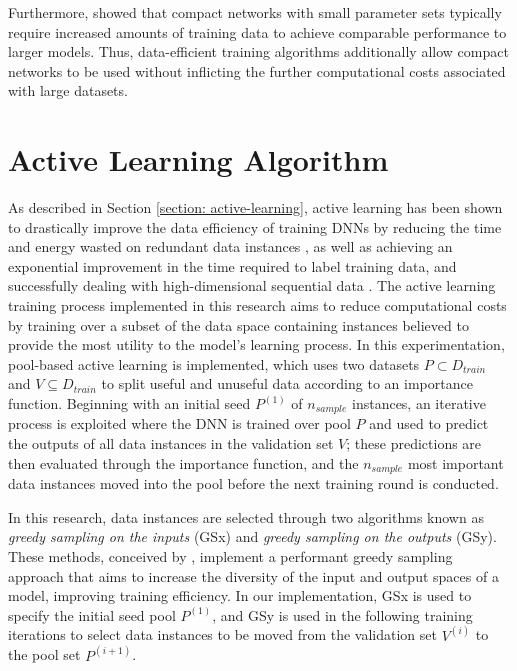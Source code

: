 \documentclass[a4paper, 11pt]{report}
\begin{document}
    Furthermore, \citet{bender-2021} showed that compact networks with small parameter sets typically require increased amounts of training data to achieve comparable performance to larger models. Thus, data-efficient training algorithms additionally allow compact networks to be used without inflicting the further computational costs associated with large datasets.


    \section{Active Learning Algorithm}
    \label{section: al-model}

    As described in Section \ref{section: active-learning}, active learning has been shown to drastically improve the data efficiency of training DNNs by reducing the time and energy wasted on redundant data instances \citep{xu-2021}, as well as achieving an exponential improvement in the time required to label training data, and successfully dealing with high-dimensional sequential data \citep{ren-2021}. The active learning training process implemented in this research aims to reduce computational costs by training over a subset of the data space containing instances believed to provide the most utility to the model's learning process. In this experimentation, pool-based active learning is implemented, which uses two datasets $P \subset D_{train}$ and $V \subseteq D_{train}$ to split useful and unuseful data according to an importance function. Beginning with an initial seed $P^{(1)}$ of $n_{sample}$ instances, an iterative process is exploited where the DNN is trained over pool $P$ and used to predict the outputs of all data instances in the validation set $V$; these predictions are then evaluated through the importance function, and the $n_{sample}$ most important data instances moved into the pool before the next training round is conducted.

    In this research, data instances are selected through two algorithms known as \emph{greedy sampling on the inputs} (GSx) and \emph{greedy sampling on the outputs} (GSy). These methods, conceived by \citet{wu-2019}, implement a performant greedy sampling approach that aims to increase the diversity of the input and output spaces of a model, improving training efficiency. In our implementation, GSx is used to specify the initial seed pool $P^{(1)}$, and GSy is used in the following training iterations to select data instances to be moved from the validation set $V^{(i)}$ to the pool set $P^{(i+1)}$. 
\end{document}
